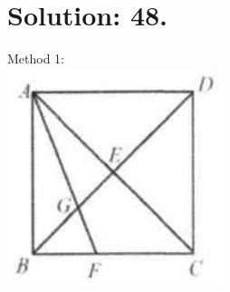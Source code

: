 \documentclass[10pt]{article}
\begin{document}
\section*{Solution: 48.}
Method 1:\\
\includegraphics[max width=\textwidth, center]{2025_04_17_97bc1f7e44d93c271a88g-109(2)}
\end{document}
